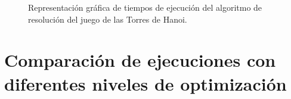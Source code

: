 \documentclass{homework}
\begin{document}
    \begin{figure}[H]
        \centering


        \caption{Representación gráfica de tiempos de ejecución del algoritmo de resolución del juego de las Torres de Hanoi.}

        \label{emp:hanoi}
    \end{figure}

    \newpage
    \section{Comparación de ejecuciones con diferentes niveles de optimización}
\end{document}
